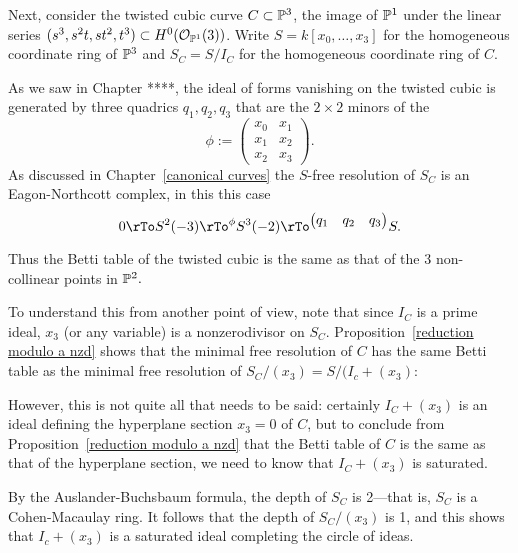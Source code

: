 \begin{example}
 Next, consider the twisted cubic curve $C\subset {\mathbb P}^{3}$, the image of ${\mathbb P}^{1}$ under the linear series
 $(s^{3}, s^{2}t, st^{2}, t^{3})\subset H^{0}({\mathcal O}_{{\mathbb P}^{1}}(3))$. Write $S = k[x_{0},\dots,x_{3}]$ for the homogeneous coordinate ring of ${\mathbb P}^{3}$ and $S_{C} = S/I_{C}$ for the homogeneous coordinate ring of $C$.

As we saw in Chapter ****, the ideal of forms vanishing on the twisted cubic is generated by three quadrics
$q_{1}, q_{2}, q_{3}$ that are the $2\times 2$ minors of the
$$
\phi := \begin{pmatrix}
 x_{0}&x_{1}\\
 x_{1}&x_{2}\\
 x_{2}&x_{3}
\end{pmatrix}.
$$
As discussed in Chapter~\ref{canonical curves} the $S$-free resolution of $S_{C}$ is an Eagon-Northcott complex, in this this case
$$
0 \rTo S^{2}(-3) \rTo^{\phi} S^{3}(-2) \rTo^{
\begin{pmatrix}
q_{1}&q_{2}&q_{3} 
\end{pmatrix}
} S.
$$

Thus the Betti table of the twisted cubic is the same as that of the 3 non-collinear points in ${\mathbb P}^{2}.$

To understand this from another point of view, note that since $I_{C}$ is a prime ideal, $x_{3}$ (or any variable) is a nonzerodivisor on $S_{C}$. Proposition~\ref{reduction modulo a nzd} shows that the minimal free resolution of $C$ has the same Betti table as the minimal free resolution of $S_{C}/(x_{3}) = S/(I_{c}+(x_{3})$:


However, this is not quite all that needs to be said: certainly $I_{C}+(x_{3})$ is an ideal defining the hyperplane section $x_{3}= 0$ of $C$, but to conclude from  Proposition~\ref{reduction modulo a nzd} that the Betti table of $C$ is the same as that of the hyperplane section, we need to know that $I_{C}+(x_{3})$ is saturated.

By the Auslander-Buchsbaum formula, the depth of $S_{C}$ is 2---that is, $S_{C}$ is a Cohen-Macaulay ring. It follows that the depth of $S_{C}/(x_{3})$ is 1, and this shows that $I_{c}+(x_{3})$ is a saturated ideal completing the circle of ideas.
\end{example}

